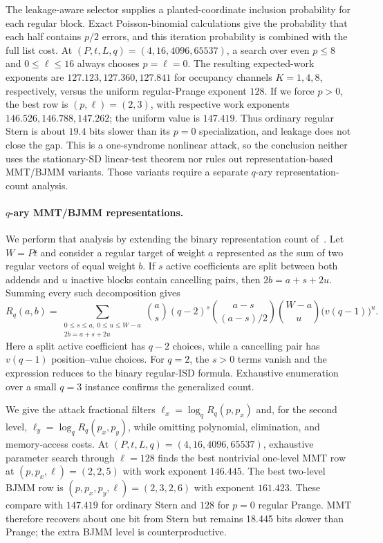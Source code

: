 The leakage-aware selector supplies a planted-coordinate inclusion
probability for each regular block.  Exact Poisson-binomial calculations give
the probability that each half contains $p/2$ errors, and this iteration
probability is combined with the full list cost.  At
$(P,t,L,q)=(4,16,4096,65537)$, a search over even $p\leq8$ and
$0\leq\ell\leq16$ always chooses $p=\ell=0$.  The resulting expected-work
exponents are $127.123,127.360,127.841$ for occupancy channels
$K=1,4,8$, respectively, versus the uniform regular-Prange exponent $128$.
If we force $p>0$, the best row is $(p,\ell)=(2,3)$, with respective work
exponents $146.526,146.788,147.262$; the uniform value is $147.419$.  Thus
ordinary regular Stern is about $19.4$ bits slower than its $p=0$ specialization,
and leakage does not close the gap.  This is a one-syndrome nonlinear attack,
so the conclusion neither uses the stationary-SD linear-test theorem nor
rules out representation-based MMT/BJMM variants.  Those variants require a
separate $q$-ary representation-count analysis.

\paragraph{$q$-ary MMT/BJMM representations.}
We perform that analysis by extending the binary representation count
of~\cite{regularISD}.  Let $W=Pt$ and consider a regular target of weight
$a$ represented as the sum of two regular vectors of equal weight $b$.  If
$s$ active coefficients are split between both addends and $u$ inactive
blocks contain cancelling pairs, then $2b=a+s+2u$.  Summing every such
decomposition gives
\[
 R_q(a,b)=
 \sum_{\substack{0\leq s\leq a,\ 0\leq u\leq W-a\\
                  2b=a+s+2u}}
 \binom as(q-2)^s
 \binom{a-s}{(a-s)/2}
 \binom{W-a}{u}\bigl(v(q-1)\bigr)^u.
\]
Here a split active coefficient has $q-2$ choices, while a cancelling pair
has $v(q-1)$ position--value choices.  For $q=2$, the $s>0$ terms vanish and
the expression reduces to the binary regular-ISD formula.  Exhaustive
enumeration over a small $q=3$ instance confirms the generalized count.

We give the attack fractional filters
$\ell_x=\log_qR_q(p,p_x)$ and, for the second level,
$\ell_y=\log_qR_q(p_x,p_y)$, while omitting polynomial, elimination, and
memory-access costs.  At $(P,t,L,q)=(4,16,4096,65537)$, exhaustive parameter
search through $\ell=128$ finds the best nontrivial one-level MMT row at
$(p,p_x,\ell)=(2,2,5)$ with work exponent $146.445$.  The best two-level BJMM
row is $(p,p_x,p_y,\ell)=(2,3,2,6)$ with exponent $161.423$.  These compare
with $147.419$ for ordinary Stern and $128$ for $p=0$ regular Prange.  MMT
therefore recovers about one bit from Stern but remains 18.445 bits slower
than Prange; the extra BJMM level is counterproductive.

